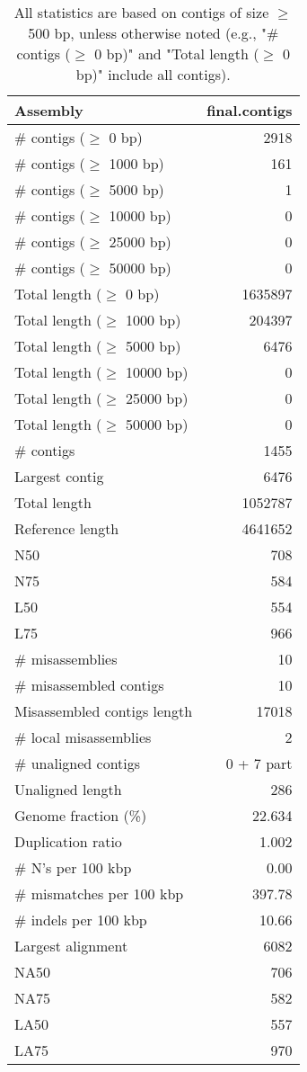 \documentclass[12pt,a4paper]{article}
\begin{document}
\begin{table}[ht]
\begin{center}
\caption{All statistics are based on contigs of size $\geq$ 500 bp, unless otherwise noted (e.g., "\# contigs ($\geq$ 0 bp)" and "Total length ($\geq$ 0 bp)" include all contigs).}
\begin{tabular}{|l*{1}{|r}|}
\hline
Assembly & final.contigs \\ \hline
\# contigs ($\geq$ 0 bp) & 2918 \\ \hline
\# contigs ($\geq$ 1000 bp) & 161 \\ \hline
\# contigs ($\geq$ 5000 bp) & 1 \\ \hline
\# contigs ($\geq$ 10000 bp) & 0 \\ \hline
\# contigs ($\geq$ 25000 bp) & 0 \\ \hline
\# contigs ($\geq$ 50000 bp) & 0 \\ \hline
Total length ($\geq$ 0 bp) & 1635897 \\ \hline
Total length ($\geq$ 1000 bp) & 204397 \\ \hline
Total length ($\geq$ 5000 bp) & 6476 \\ \hline
Total length ($\geq$ 10000 bp) & 0 \\ \hline
Total length ($\geq$ 25000 bp) & 0 \\ \hline
Total length ($\geq$ 50000 bp) & 0 \\ \hline
\# contigs & 1455 \\ \hline
Largest contig & 6476 \\ \hline
Total length & 1052787 \\ \hline
Reference length & 4641652 \\ \hline
N50 & 708 \\ \hline
N75 & 584 \\ \hline
L50 & 554 \\ \hline
L75 & 966 \\ \hline
\# misassemblies & 10 \\ \hline
\# misassembled contigs & 10 \\ \hline
Misassembled contigs length & 17018 \\ \hline
\# local misassemblies & 2 \\ \hline
\# unaligned contigs & 0 + 7 part \\ \hline
Unaligned length & 286 \\ \hline
Genome fraction (\%) & 22.634 \\ \hline
Duplication ratio & 1.002 \\ \hline
\# N's per 100 kbp & 0.00 \\ \hline
\# mismatches per 100 kbp & 397.78 \\ \hline
\# indels per 100 kbp & 10.66 \\ \hline
Largest alignment & 6082 \\ \hline
NA50 & 706 \\ \hline
NA75 & 582 \\ \hline
LA50 & 557 \\ \hline
LA75 & 970 \\ \hline
\end{tabular}
\end{center}
\end{table}
\end{document}
